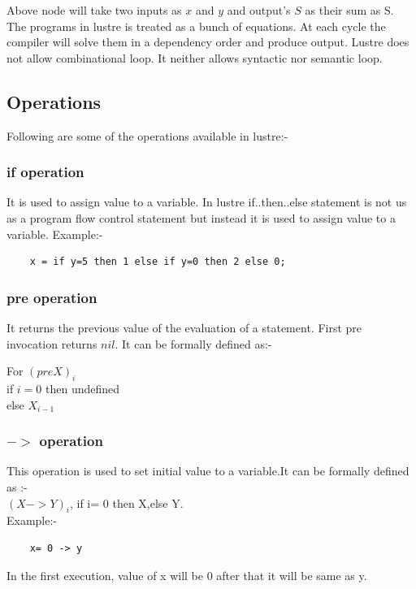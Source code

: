 \documentclass[16pt]{report}
\begin{document}
\noindent
Above node will take two inputs as $x$ and $y$ and output's $S$ as their sum as S.\\

The programs in lustre is treated as a bunch of equations. At each cycle the compiler will solve them in a dependency order and produce output. Lustre does not allow  combinational loop. It neither allows syntactic nor semantic loop.

\subsection{Operations}
Following are some of the operations available in lustre:-
\subsubsection{if operation}
It is  used to assign value to a variable. In lustre if..then..else statement is not us as a program flow control statement but instead it is used to assign value to a variable. Example:-
\begin{verbatim}
    x = if y=5 then 1 else if y=0 then 2 else 0;
\end{verbatim}


\subsubsection{pre operation}
It returns the previous value of the evaluation of a statement. First pre invocation returns $nil$. It can be formally defined as:-\\ 
{
\centering

    For $(pre X)_i$\\
    if $i=0$ then undefined \\
    else $X_{i-1}$
    
}
\subsubsection{$->$ operation}
This operation is used to set initial value to a variable.It can be formally defined as  :-\\
$(X->Y)_i$, if i= 0 then X,else Y.\\
Example:-
\begin{verbatim}
    x= 0 -> y
\end{verbatim}
In the first execution, value of x will be 0 after that it will be same as y.
\end{document}
